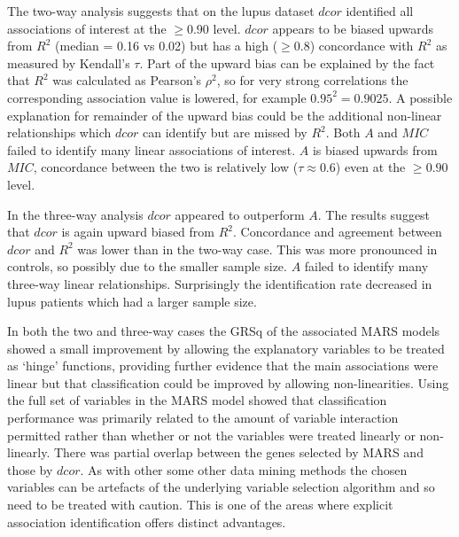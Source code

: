 \documentclass[a4paper, 12pt]{report}
\begin{document}
The two-way analysis suggests that on the lupus dataset $dcor$ identified all associations of interest at the $\ge 0.90$ level.  $dcor$ appears to be biased upwards from $R^2$ (median = 0.16 vs 0.02) but has a high ($\ge 0.8$) concordance with $R^2$ as measured by Kendall's $\tau$. Part of the upward bias can be explained by the fact that $R^2$ was calculated as Pearson's $\rho^2$, so for very strong correlations the corresponding association value is lowered, for example $0.95^2 = 0.9025$. A possible explanation for remainder of the upward bias could be the additional non-linear relationships which $dcor$ can identify but are missed by $R^2$. Both $A$ and $MIC$ failed to identify many linear associations of interest. $A$ is biased upwards from $MIC$, concordance between the two is relatively low ($\tau \approx 0.6$) even at the $\ge0.90$ level.

In the three-way analysis $dcor$ appeared to outperform $A$. The results suggest that $dcor$ is again upward biased from $R^2$. Concordance and agreement between $dcor$ and $R^2$ was lower than in the two-way case. This was more pronounced in controls, so possibly due to the smaller sample size. $A$ failed to identify many three-way linear relationships. Surprisingly the identification rate decreased in lupus patients which had a larger sample size.  

In both the two and three-way cases the GRSq of the associated MARS models showed a small improvement by allowing the explanatory variables to be treated as `hinge' functions, providing further evidence that the main associations were linear but that classification could be improved by allowing non-linearities. Using the full set of variables in the MARS model showed that classification performance was primarily related to the amount of variable interaction permitted rather than whether or not the variables were treated linearly or non-linearly. There was partial overlap between the genes selected by MARS and those by $dcor$. As with other some other data mining methods the chosen variables can be artefacts of the underlying variable selection algorithm and so need to be treated with caution. This is one of the areas where explicit association identification offers distinct advantages.

\end{document}
